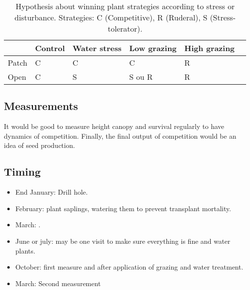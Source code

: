 \documentclass[12pt]{article} %
\begin{document}
\begin{table} %
\begin{center}
\begin{tabular}{|l|l|l|l|l|l|}
  \hline
  & Control & Water stress & Low grazing & High grazing  \\
  \hline
  Patch & C & C & C & R \\
  \hline
  Open & C & S & S ou R & R \\
  \hline
\end{tabular} 
\end{center}
\caption{Hypothesis about winning plant strategies according to stress or disturbance.  Strategies: C (Competitive), R (Ruderal), S (Stress-tolerator). \label{hyp}}
\end{table}

\subsection{Measurements}
It would be good to measure height canopy and survival regularly to have dynamics of competition. Finally, the final output of competition would be an idea of seed production. 


\subsection{Timing}
\begin{itemize}

\item End January: Drill hole.
\item February: plant saplings, watering them to prevent transplant mortality.
\item March: .
\item June or july: may be one visit to make sure everything is fine and water plants.
\item October: first measure and after application of grazing and water treatment.
\item March: Second measurement

\end{itemize}




\end{document}
